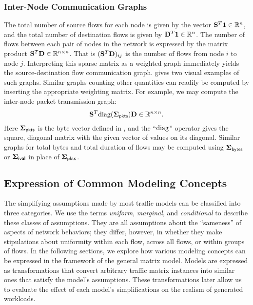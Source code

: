 \documentclass[twocolumn,final]{svjour3}
\begin{document}
\subsubsection{Inter-Node Communication Graphs}
\label{sec:communication-topology}

The total number of source flows for each node is given by the vector ${\mathbf{S}}^T\mathbf{1} \in \mathbb{R}^n$, and the total number of destination flows is given by ${\mathbf{D}}^T\mathbf{1} \in \mathbb{R}^n$.
The number of flows between each pair of nodes in the network is expressed by the matrix product ${\mathbf{S}}^T\mathbf{D}\in\mathbb{R}^{n \times n}$.
That is $({\mathbf{S}}^T\mathbf{D})_{ij}$ is the number of flows from node $i$ to node $j$.
Interpreting this sparse matrix as a weighted graph immediately yields the source-destination flow communication graph.
 gives two visual examples of such graphs.
Similar graphs counting other quantities can readily be computed by inserting the appropriate weighting matrix.
For example, we may compute the inter-node packet transmission graph:
\begin{align}
\trans{\mat{S}}\diag(\vec{\Sigma}_\pkts)\mat{D}\in\R^{n \times n}.
\end{align}
Here $\vec{\Sigma}_\pkts$ is the byte vector defined in , and the ``$\text{diag}$'' operator gives the square, diagonal matrix with the given vector of values on its diagonal.
Similar graphs for total bytes and total duration of flows may be computed using $\mathbf{\Sigma}_{\text{\textsf{bytes}}}$ or $\mathbf{\Sigma}_{\text{\textsf{ival}}}$ in place of $\mathbf{\Sigma}_{\text{\textsf{pkts}}}$.

\subsection{Expression of Common Modeling Concepts}

The simplifying assumptions made by most traffic models can be classified into three categories. We use the terms \textit{uniform}, \textit{marginal}, and \textit{conditional} to describe these classes of assumptions. They are all assumptions about the ``sameness'' of aspects of network behaviors; they differ, however, in whether they make stipulations about uniformity within each flow, across all flows, or within groups of flows. In the following sections, we explore how various modeling concepts can be expressed in the framework of the general matrix model. Models are expressed as transformations that convert arbitrary traffic matrix instances into similar ones that satisfy the model's assumptions. These transformations later allow us to evaluate the effect of each model's simplifications on the realism of generated workloads.
\end{document}

